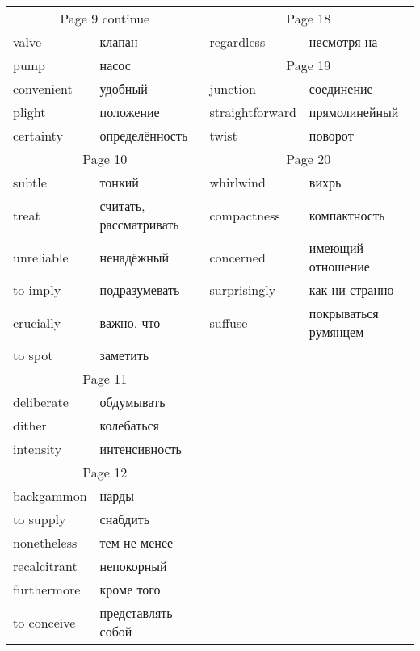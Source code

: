 \documentclass[12pt]{article}
\begin{document}
\begin{tabular}{| l l | l l | }
  \hline

  \multicolumn{2}{|c|}{Page 9 continue} & \multicolumn{2}{c|}{Page 18} \\
  valve      & клапан         & regardless      & несмотря на          \\ \cline{3-4}
  pump       & насос          & \multicolumn{2}{c|}{Page 19}           \\
  convenient & удобный        & junction        & соединение           \\
  plight     & положение      & straightforward & прямолинейный        \\
  certainty  & определённость & twist           & поворот              \\
  \hline

  \multicolumn{2}{|c|}{Page 10} & \multicolumn{2}{|c|}{Page 20}             \\
  subtle     & тонкий                 & whirlwind    & вихрь                \\
  treat      & считать, рассматривать & compactness  & компактность         \\ 
  unreliable & ненадёжный             & concerned    & имеющий отношение    \\
  to imply   & подразумевать          & surprisingly & как ни странно       \\ 
  crucially  & важно, что             & suffuse      & покрываться румянцем \\
  to spot    & заметить && \\
  
  \cline{1-2}\multicolumn{2}{|c|}{Page 11} && \\
  deliberate & обдумывать                  && \\
  dither     & колебаться                  && \\
  intensity  & интенсивность               && \\

  \cline{1-2}\multicolumn{2}{|c|}{Page 12} && \\
  backgammon   & нарды                     && \\
  to supply    & снабдить                  && \\
  nonetheless  & тем не менее              && \\
  recalcitrant & непокорный                && \\
  furthermore  & кроме того                && \\
  to conceive  & представлять собой        && \\


\end{tabular}
\end{document}
